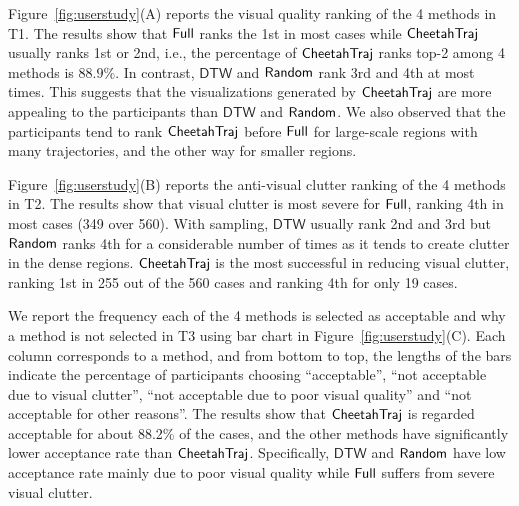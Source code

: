  Figure~\ref{fig:userstudy}(A) reports the visual quality ranking of the 4 methods in T1. 
The results show that $\mathsf{Full}$ ranks the 1st in most cases while $\mathsf{CheetahTraj}$ usually ranks 1st or 2nd, i.e., the percentage of $\mathsf{CheetahTraj}$ ranks top-2 among 4 methods is $88.9\%$. 
In contrast, $\mathsf{DTW}$ and $\mathsf{Random}$ rank 3rd and 4th at most times. 
This suggests that the visualizations generated by $\mathsf{CheetahTraj}$ are more appealing to the participants than $\mathsf{DTW}$ and $\mathsf{Random}$. 
We also observed that the participants tend to rank $\mathsf{CheetahTraj}$ before $\mathsf{Full}$ for large-scale regions with  many trajectories, and the other way for smaller regions. 


Figure~\ref{fig:userstudy}(B) reports the anti-visual clutter ranking of the 4 methods in T2. 
The results show that visual clutter is most severe for $\mathsf{Full}$, ranking 4th in most cases (349 over 560). With sampling, $\mathsf{DTW}$ usually rank 2nd and 3rd but $\mathsf{Random}$ ranks 4th for a considerable number of times as it tends to create clutter in the dense regions.    
$\mathsf{CheetahTraj}$ is the most successful in reducing visual clutter, ranking 1st in 255 out of the 560 cases and ranking 4th for only 19 cases.    



We report the frequency each of the 4 methods is selected as acceptable and why a method is not selected in T3 using bar chart in Figure~\ref{fig:userstudy}(C). 
Each column corresponds to a method, and from bottom to top, the lengths of the bars indicate the percentage of participants choosing ``acceptable'', ``not acceptable due to visual clutter'', ``not acceptable due to poor visual quality'' and ``not acceptable for other reasons''. 
The results show that $\mathsf{CheetahTraj}$ is regarded acceptable for about 88.2\% of the cases, and the other methods have significantly lower acceptance rate than $\mathsf{CheetahTraj}$. 
Specifically, $\mathsf{DTW}$ and $\mathsf{Random}$ have low acceptance rate mainly due to poor visual quality while $\mathsf{Full}$ suffers from severe visual clutter.





